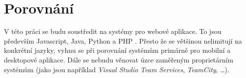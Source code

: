 \newcommand{\todoPorovani}[1]{
    \subsection{Architektura #1, možnosti konfigurace}
        \todo{Jaké má #1 části, jak se to deployuje, externí závislosti\ldots}\blind[4]
    \subsection{Rozšiřitelnost}
        \todo{Má #1 nějaké pluginy, dá se pro to scriptovat, jak je to bezpečné a jednoduché?}\blind[3]
    \subsection{Zabezpečení}
        \todo{Jaké jsou historická CVE? Jaká je izolace klientů? Co aplikace potřebuje za přístupy?}\blind[3]
    \subsection{Dostupnost}
        \todo{Může #1 běžet ve víc replikách? Jak se dělá upgrade? Jak stabilní to je?}\blind[3]
    \subsection{Integrace}
        \todo{Integrace #1, oznámení na GitHub/GitLab/Bitbucket/\ldots}\blind[2]
        \todo{Možnosti deploy z #1 do cílového systému; k8s, sftp, openstack, \ldots}\blind[5]
    \subsection{Praktické nasazení projektů}
        \subsubsection{Projekt 1}
            \todo{Popsat deploy projektu 1 z #1}\blind[2]
        \subsubsection{Projekt 2}
            \todo{Popsat deploy projektu 2 z #1}\blind[2]
        \subsubsection{Projekt 3}
            \todo{Popsat deploy projektu 3 z #1}\blind[2]
}

\chapter{Porovnání}
    V této práci se budu soustředit na systémy pro webové aplikace. To jsou především Javascript, Java, Python a PHP \cite{github-octoverse-languages}. Přesto že se \CI většinou nelimitují na konkrétní jazyky, vyhnu se při porovnání systémům primárně pro mobilní a desktopové aplikace. Dále se nebudu věnovat úzce zaměřeným proprietárním systémům (jako jsou například \textit{Visual Studio Team Services}, \textit{TeamCity}, \ldots).

